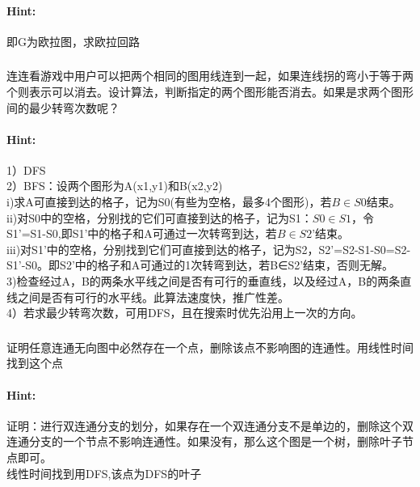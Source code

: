 \documentclass{article}
\begin{document}
     \paragraph{Hint:}即G为欧拉图，求欧拉回路\\
     
     \subsubsection{}连连看游戏中用户可以把两个相同的图用线连到一起，如果连线拐的弯小于等于两个则表示可以消去。设计算法，判断指定的两个图形能否消去。如果是求两个图形间的最少转弯次数呢？
     \paragraph{Hint:}1）DFS\\
        2）BFS：设两个图形为A(x1,y1)和B(x2,y2)\\
        i)求A可直接到达的格子，记为S0(有些为空格，最多4个图形)，若$B\in S0$结束。\\
        ii)对S0中的空格，分别找的它们可直接到达的格子，记为S1：$S0 \in S1$，令S1’=S1-S0,即S1’中的格子和A可通过一次转弯到达，若$B \in S2’$结束。\\
        iii)对S1’中的空格，分别找到它们可直接到达的格子，记为S2，S2’=S2-S1-S0=S2-S1’-S0。即S2’中的格子和A可通过的1次转弯到达，若B∈S2’结束，否则无解。\\
        3)检查经过A，B的两条水平线之间是否有可行的垂直线，以及经过A，B的两条直线之间是否有可行的水平线。此算法速度快，推广性差。\\
        4）若求最少转弯次数，可用DFS，且在搜索时优先沿用上一次的方向。\\

     
     
     \subsubsection{}证明任意连通无向图中必然存在一个点，删除该点不影响图的连通性。用线性时间找到这个点
     \paragraph{Hint:}证明：进行双连通分支的划分，如果存在一个双连通分支不是单边的，删除这个双连通分支的一个节点不影响连通性。如果没有，那么这个图是一个树，删除叶子节点即可。\\
     线性时间找到用DFS,该点为DFS的叶子\\
     
\end{document}
